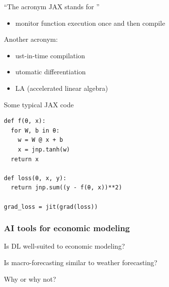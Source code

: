 \begin{frame}

    ``The acronym JAX stands for ''

    \begin{itemize}
        \item monitor function execution once and then compile
    \end{itemize} 

            \vspace{0.5em}
            \vspace{0.5em}
            \vspace{0.5em}

    Another acronym:

    \begin{itemize}
        \item {}ust-in-time compilation
            \vspace{0.5em}
        \item {}utomatic differentiation
            \vspace{0.5em}
        \item {}LA (accelerated linear algebra)
    \end{itemize}



\end{frame}


\begin{frame}[fragile]

    Some typical JAX code
    
    \begin{verbatim}
def f(θ, x):
  for W, b in θ:
    w = W @ x + b
    x = jnp.tanh(w)  
  return x

def loss(θ, x, y):
  return jnp.sum((y - f(θ, x))**2)

grad_loss = jit(grad(loss))  
    \end{verbatim}

\end{frame}


\begin{frame}
    \frametitle{AI tools for economic modeling}

    Is DL well-suited to economic modeling?

    \medskip

    \Eg Is macro-forecasting similar to weather forecasting?

    \medskip
    \medskip

    Why or why not?

\end{frame}




